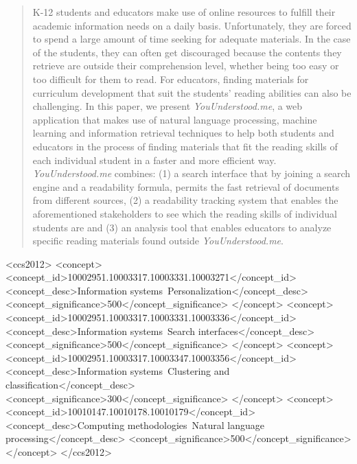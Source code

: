 \documentclass{sig-alternate-05-2015}
\begin{document}
\maketitle
\begin{abstract}


K-12 students and educators make use of online resources to fulfill their academic information needs on a daily basis. Unfortunately, they are forced to spend a large amount of time seeking for adequate materials. In the case of the students, they can often get discouraged because the contents they retrieve are outside their comprehension level, whether being too easy or too difficult  for them to read. For educators, finding materials for curriculum development that suit the students' reading abilities can also be challenging.  In this paper, we present \textit{YouUnderstood.me}, a web application that makes use of natural language processing, machine learning and information retrieval techniques to help both students and educators in the process of finding materials that fit the reading skills of each individual student in a faster and more efficient way. \textit{YouUnderstood.me} combines: (1) a search interface that by joining a search engine and a readability formula, permits the fast retrieval of documents from different sources, (2)  a readability tracking system that enables the aforementioned stakeholders to see which the reading skills of individual students are  and (3) an analysis tool that enables educators to analyze specific reading materials found outside \textit{YouUnderstood.me}.






\end{abstract}


%
%



 \begin{CCSXML}
<ccs2012>
<concept>
<concept_id>10002951.10003317.10003331.10003271</concept_id>
<concept_desc>Information systems~Personalization</concept_desc>
<concept_significance>500</concept_significance>
</concept>
<concept>
<concept_id>10002951.10003317.10003331.10003336</concept_id>
<concept_desc>Information systems~Search interfaces</concept_desc>
<concept_significance>500</concept_significance>
</concept>
<concept>
<concept_id>10002951.10003317.10003347.10003356</concept_id>
<concept_desc>Information systems~Clustering and classification</concept_desc>
<concept_significance>300</concept_significance>
</concept>
<concept>
<concept_id>10010147.10010178.10010179</concept_id>
<concept_desc>Computing methodologies~Natural language processing</concept_desc>
<concept_significance>500</concept_significance>
</concept>
</ccs2012>
\end{CCSXML}
\end{document}
